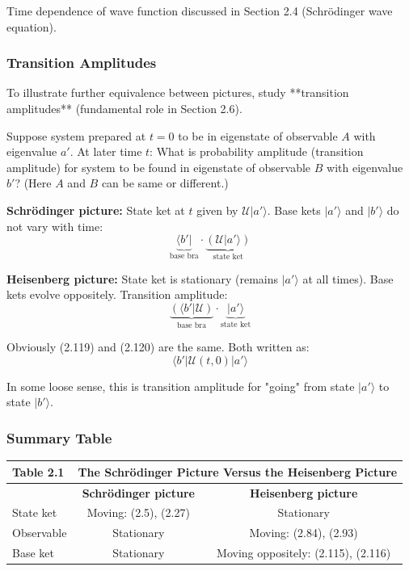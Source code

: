 \documentclass[11pt,a4paper]{article}
\begin{document}
Time dependence of wave function discussed in Section 2.4 (Schrödinger wave equation).

\subsubsection{Transition Amplitudes}

To illustrate further equivalence between pictures, study **transition amplitudes** (fundamental role in Section 2.6).

Suppose system prepared at $t = 0$ to be in eigenstate of observable $A$ with eigenvalue $a'$. At later time $t$: What is probability amplitude (transition amplitude) for system to be found in eigenstate of observable $B$ with eigenvalue $b'$? (Here $A$ and $B$ can be same or different.)

\textbf{Schrödinger picture:} State ket at $t$ given by $\mathscr{U}|a'\rangle$. Base kets $|a'\rangle$ and $|b'\rangle$ do not vary with time:
\begin{equation}
\underbrace{\langle b'|}_{\text{base bra}} \cdot \underbrace{(\mathscr{U}|a'\rangle)}_{\text{state ket}}
\tag{2.119}
\end{equation}

\textbf{Heisenberg picture:} State ket is stationary (remains $|a'\rangle$ at all times). Base kets evolve oppositely. Transition amplitude:
\begin{equation}
\underbrace{(\langle b'|\mathscr{U})}_{\text{base bra}} \cdot \underbrace{|a'\rangle}_{\text{state ket}}
\tag{2.120}
\end{equation}

Obviously (2.119) and (2.120) are the same. Both written as:
\begin{equation}
\langle b'|\mathscr{U}(t, 0)|a'\rangle
\tag{2.121}
\end{equation}

In some loose sense, this is transition amplitude for "going" from state $|a'\rangle$ to state $|b'\rangle$.

\subsubsection{Summary Table}

\begin{center}
\begin{tabular}{|l|c|c|}
\hline
\textbf{Table 2.1} & \multicolumn{2}{c|}{\textbf{The Schrödinger Picture Versus the Heisenberg Picture}} \\
\hline
& \textbf{Schrödinger picture} & \textbf{Heisenberg picture} \\
\hline
State ket & Moving: (2.5), (2.27) & Stationary \\
Observable & Stationary & Moving: (2.84), (2.93) \\
Base ket & Stationary & Moving oppositely: (2.115), (2.116) \\
\hline
\end{tabular}
\end{center}
\end{document}
